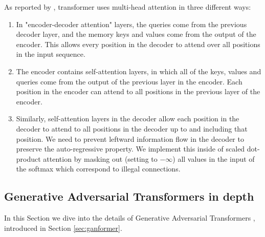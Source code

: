 \documentclass{article}
\begin{document}
	As reported by \cite{vaswani2017attention}, transformer uses multi-head attention in three 
	different 
	ways:
	\begin{enumerate}
		\item In "encoder-decoder attention" layers, the queries come from the previous decoder 
		layer, 
		and the memory keys and values come from the output of the encoder. This allows every 
		position in the decoder to attend over all positions in the input sequence.
		\item The encoder contains self-attention layers, in which all of the keys, values 
		and queries come from the output of the previous layer in the encoder. 
		Each position in the encoder can attend to all positions in the previous layer of the encoder.
		\item Similarly, self-attention layers in the decoder allow each position in the decoder to 
		attend 
		to all positions in the decoder up to and including that position. We need to prevent leftward 
		information flow in the decoder to preserve the auto-regressive property. We implement 
		this 
		inside of scaled dot-product attention by masking out (setting to $-\infty$) all values in the 
		input of the softmax which correspond to illegal connections. 
	\end{enumerate}
	
	
	\subsection{Generative Adversarial Transformers in depth} \label{subsec:app_methodology}
	In this Section we dive into the details of Generative Adversarial Transformers 
	\cite{hudson2021generative}, introduced in Section \ref{sec:ganformer}. 
	
\end{document}
